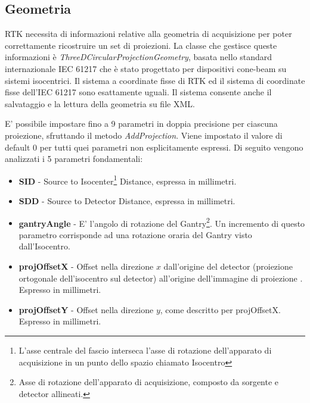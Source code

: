 \documentclass[a4paper,12pt, doubleside]{report}
\begin{document}
            \subsection{Geometria}
                \label{sec:rtk-geometry}
                \par
                    RTK necessita di informazioni relative alla geometria di acquisizione per poter correttamente ricostruire un set di proiezioni. La classe che gestisce queste informazioni è\textit{ ThreeDCircularProjectionGeometry}, basata nello standard internazionale IEC 61217 che è stato progettato per dispositivi cone-beam su sistemi isocentrici. Il sistema a coordinate fisse di RTK ed il sistema di coordinate fisse dell'IEC 61217 sono esattamente uguali. Il sistema consente anche il salvataggio e la lettura della geometria su file XML.
                
                \bigskip
                \par
                    E' possibile impostare fino a 9 parametri in doppia precisione per ciascuna proiezione, sfruttando il metodo \textit{AddProjection}. Viene impostato il valore di default $0$ per tutti quei parametri non esplicitamente espressi. Di seguito vengono analizzati i 5 parametri fondamentali:
                        
                    \begin{itemize}
                        \item \textbf{SID} - Source to Isocenter\footnote{L’asse centrale del fascio interseca l’asse di rotazione dell'apparato di acquisizione in un punto dello spazio chiamato Isocentro} Distance, espressa in millimetri.
                        \item \textbf{SDD} - Source to Detector Distance, espressa in millimetri.
                        \item \textbf{gantryAngle} - E' l'angolo di rotazione del Gantry\footnote{Asse di rotazione dell'apparato di acquisizione, composto da sorgente e detector allineati.}. Un incremento di questo parametro corrisponde ad una rotazione oraria del Gantry visto dall'Isocentro.
                        \item \textbf{projOffsetX} - Offset nella direzione $x$ dall'origine del detector (proiezione ortogonale dell'isocentro sul detector) all'origine dell'immagine di proiezione \cite{rtk-users-proj-offset}. Espresso in millimetri. 
                        \item \textbf{projOffsetY} - Offset nella direzione $y$, come descritto per projOffsetX. Espresso in millimetri.
                    \end{itemize}
                    
\end{document}
